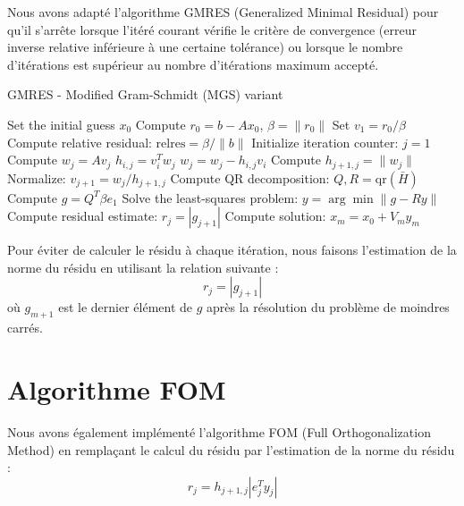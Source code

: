\documentclass[12pt,a4paper]{article}
\begin{document}
Nous avons adapté l'algorithme GMRES (Generalized Minimal Residual) pour qu'il s'arrête lorsque l’itéré courant vérifie le critère de convergence (erreur inverse relative inférieure à une certaine tolérance) ou lorsque le nombre d’itérations est supérieur au nombre d’itérations maximum accepté.

\begin{algorithm}
    \caption{GMRES - Modified Gram-Schmidt (MGS) variant}
    \begin{algorithmic}[1] %
        \State Set the initial guess $x_0$
        \State Compute $r_0 = b - Ax_0$, $\beta = \|r_0\|$
        \State Set $v_1 = r_0 / \beta$
        \State Compute relative residual: $\text{relres} = \beta / \|b\|$
        \State Initialize iteration counter: $j = 1$
            \State Compute $w_j = Av_j$
            \State $h_{i,j} = v_i^T w_j$
            \State $w_j = w_j - h_{i,j} v_i$
            \EndFor
            \State Compute $h_{j+1,j} = \|w_j\|$
            \State Normalize: $v_{j+1} = w_j / h_{j+1,j}$
            \State Compute QR decomposition: $Q, R = \text{qr}(\bar{H})$
            \State Compute $g = Q^T \beta e_1$
            \State Solve the least-squares problem: $y = \arg \min \|g - Ry\|$
            \State Compute residual estimate: $r_j = |g_{j+1}|$
        \EndWhile
        \State Compute solution: $x_m = x_0 + V_m y_m$
    \end{algorithmic}
\end{algorithm}

Pour éviter de calculer le résidu à chaque itération, nous faisons l'estimation de la norme du résidu en utilisant la relation suivante :
$$
r_j = |g_{j+1}|
$$
où $g_{m+1}$ est le dernier élément de $g$ après la résolution du problème de moindres carrés.


\section{Algorithme FOM}

Nous avons également implémenté l'algorithme FOM (Full Orthogonalization Method) en remplaçant le calcul du résidu par l'estimation de la norme du résidu :
$$
r_j = h_{j+1,j} |e_j^T y_j|
$$
\end{document}
